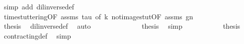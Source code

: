 \begin{isabellebody}
\ {\isacharparenleft}simp\ add{\isacharcolon}\ dil{\isacharunderscore}inverse{\isacharunderscore}def{\isacharparenright}\isanewline
\ \ \ \ \ \ \ \ \ \ \isamarkupfalse%
\ time{\isacharunderscore}stuttering{\isacharbrackleft}OF\ assms\ tau{\isacharcomma}\ of\ k{\isacharbrackright}\ not{\isacharunderscore}image{\isacharunderscore}stut{\isacharbrackleft}OF\ assms\ gn{\isacharbrackright}\isanewline
\ \ \ \ \ \ \ \ \ \ \ \ \isamarkupfalse%
\ {\isacharquery}thesis\ \isamarkupfalse%
\ dil{\isacharunderscore}inverse{\isacharunderscore}def\ \isamarkupfalse%
\ auto\isanewline
\ \ \ \ \ \ \isamarkupfalse%
\isanewline
\ \ \ \ \isacommand{{\isacharbraceright}}\isamarkupfalse%
\ \isamarkupfalse%
\ {\isacharquery}thesis\ \isamarkupfalse%
\ simp\isanewline
\ \ \isamarkupfalse%
\isanewline
\isanewline
\ \ \isamarkupfalse%
\ {\isacharasterisk}\ {}\ {}\ \isamarkupfalse%
\ {\isacharquery}thesis\ \isamarkupfalse%
\ contracting{\isacharunderscore}def\ \isamarkupfalse%
\ simp\isanewline
{}\isamarkupfalse%
%
\endisatagproof
{\isafoldproof}%
%
\isadelimproof
\isanewline
%
\endisadelimproof
%
\isadelimtheory
\isanewline
%
\endisadelimtheory
%
\isatagtheory
{}\isamarkupfalse%
%
\endisatagtheory
{\isafoldtheory}%
%
\isadelimtheory
%
\endisadelimtheory
%
\end{isabellebody}%
\endinput
